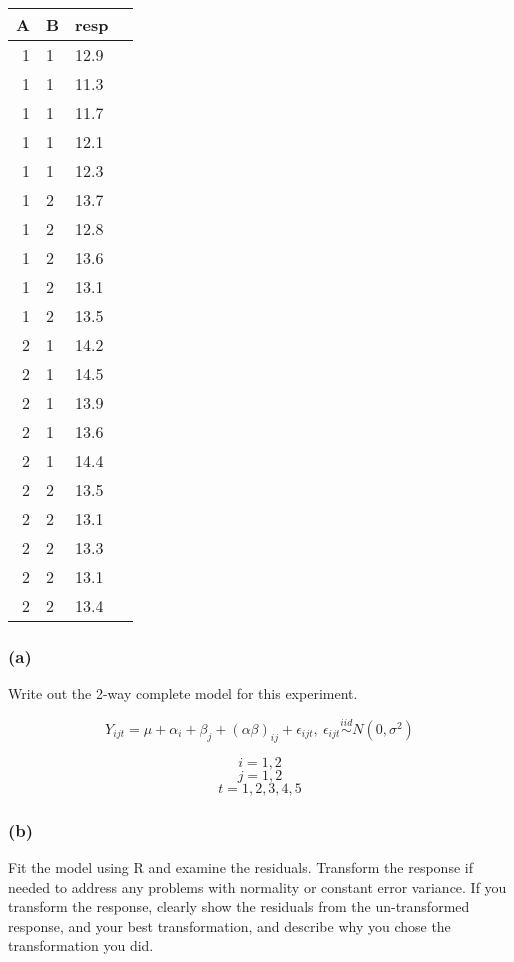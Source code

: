 \documentclass[11pt]{article}
\begin{document}
    \begin{tabular}{|r|l|l|l|}
 A & B & resp\\
\hline
	 1    & 1    & 12.9\\
	 1    & 1    & 11.3\\
	 1    & 1    & 11.7\\
	 1    & 1    & 12.1\\
	 1    & 1    & 12.3\\
	 1    & 2    & 13.7\\
	 1    & 2    & 12.8\\
	 1    & 2    & 13.6\\
	 1    & 2    & 13.1\\
	 1    & 2    & 13.5\\
	 2    & 1    & 14.2\\
	 2    & 1    & 14.5\\
	 2    & 1    & 13.9\\
	 2    & 1    & 13.6\\
	 2    & 1    & 14.4\\
	 2    & 2    & 13.5\\
	 2    & 2    & 13.1\\
	 2    & 2    & 13.3\\
	 2    & 2    & 13.1\\
	 2    & 2    & 13.4\\
\end{tabular}


    
    \subsubsection*{(a)}\label{a}

Write out the 2-way complete model for this experiment.

\[Y_{ijt} = \mu + \alpha_i + \beta_j + (\alpha \beta)_{ij} + \epsilon_{ijt}, \: \epsilon_{ijt}
\stackrel{iid}{\sim} N(0, \sigma^2)\]

\[i = 1, 2\] \[j = 1, 2\] \[t = 1, 2, 3, 4, 5\]

    \subsubsection*{(b)}\label{b}

Fit the model using R and examine the residuals. Transform the response
if needed to address any problems with normality or constant error
variance. If you transform the response, clearly show the residuals from
the un-transformed response, and your best transformation, and describe
why you chose the transformation you did.
\end{document}
